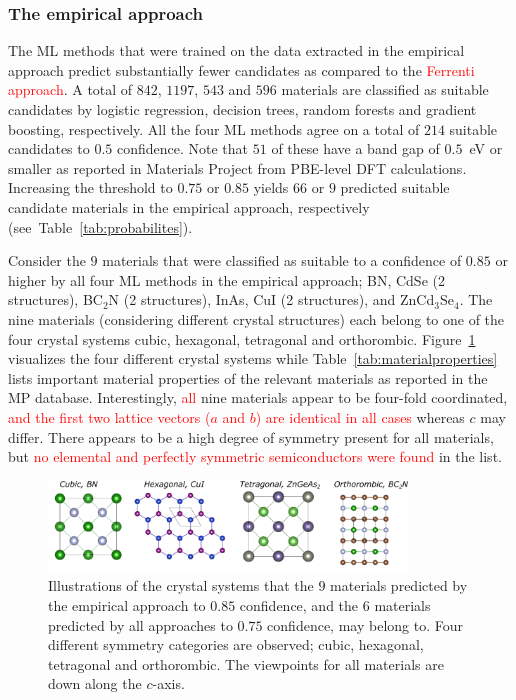 \documentclass[superscriptaddress,unsortedaddress,
 amsmath,amssymb,
 aps,
]{revtex4-2}
\newcommand{\mrk}[1]{\textcolor{red}{#1}}
\begin{document}
\subsubsection*{The empirical approach}
The ML methods that were trained on the data extracted in the empirical approach predict substantially fewer candidates as compared to the \mrk{Ferrenti approach}. 
A total of $842$, $1197$, $543$ and $596$ materials are classified as suitable candidates by logistic regression, decision trees, random forests and gradient boosting, respectively. All the four ML methods agree on a total of $214$ suitable candidates to $0.5$ confidence.   
Note that $51$ of these have a band gap of $0.5$~eV or smaller as reported in Materials Project \cite{Jain2013,Jain2018} from PBE-level DFT calculations. Increasing the threshold to $0.75$ or $0.85$ yields $66$ or $9$ predicted suitable candidate materials in the empirical approach, respectively (see~Table~\ref{tab:probabilites}). 

Consider the $9$ materials that were classified as suitable to a confidence of $0.85$ or higher by all four ML methods in the empirical approach; BN, CdSe (2 structures), BC$_2$N (2 structures), InAs, CuI (2 structures), and ZnCd$_3$Se$_4$. 
The nine materials (considering different crystal structures) each belong to one of the four crystal systems cubic, hexagonal, tetragonal and orthorombic. Figure~\ref{fig:crystalsystems} visualizes the four different crystal systems while Table~\ref{tab:materialproperties} lists important material properties of the relevant materials as reported in the MP database.  Interestingly, \mrk{all} nine materials appear to be four-fold coordinated, \mrk{and the first two lattice vectors ($a$ and $b$) are identical in all cases} whereas $c$ may differ.  
There appears to be a high degree of symmetry present for all materials, but \mrk{no elemental and perfectly symmetric semiconductors were found} in the list. 

\begin{figure}[t]
    \centering
    \includegraphics[width=0.85\textwidth]{figures/vesta-images/fig6-all.png}
    \caption{Illustrations of the crystal systems that the $9$ materials predicted by the empirical approach to $0.85$ confidence, and the $6$ materials predicted by all approaches to $0.75$ confidence, may belong to. Four different symmetry categories are observed; cubic, hexagonal, tetragonal and orthorombic. The viewpoints for all materials are down along the $c$-axis.   }
    \label{fig:crystalsystems}
\end{figure}
\end{document}
